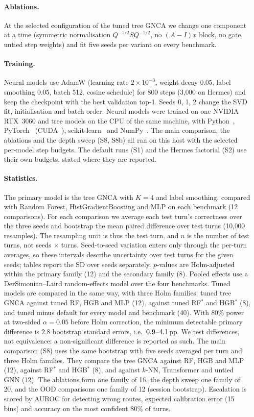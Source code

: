 \documentclass[10pt]{article}
\begin{document}
\paragraph{Ablations.} At the selected configuration of the tuned tree GNCA we change one component at a time (symmetric normalisation $Q^{-1/2}SQ^{-1/2}$, no $(A{-}I)x$ block, no gate, untied step weights) and fit five seeds per variant on every benchmark.
\paragraph{Training.} Neural models use AdamW (learning rate $2\times10^{-3}$, weight decay 0.05, label smoothing 0.05, batch 512, cosine schedule) for 800 steps (3{,}000 on Hermes) and keep the checkpoint with the best validation top-1. Seeds 0, 1, 2 change the SVD fit, initialisation and batch order. Neural models were trained on one NVIDIA RTX~3060 and tree models on the CPU of the same machine, with Python~\numEnvPython, PyTorch~\numEnvTorch{} (CUDA~\numEnvCuda), scikit-learn~\numEnvSklearn{} and NumPy~\numEnvNumpy. The main comparison, the ablations and the depth sweep (S8, S8b) all ran on this host with the selected per-model step budgets. The default runs (S1) and the Hermes factorial (S2) use their own budgets, stated where they are reported.
\paragraph{Statistics.} The primary model is the tree GNCA with $K{=}4$ and label smoothing, compared with Random Forest, HistGradientBoosting and MLP on each benchmark (12 comparisons). For each comparison we average each test turn's correctness over the three seeds and bootstrap the mean paired difference over test turns (10{,}000 resamples). The resampling unit is thus the test turn, and $n$ is the number of test turns, not seeds $\times$ turns. Seed-to-seed variation enters only through the per-turn averages, so these intervals describe uncertainty over test turns for the given seeds; tables report the SD over seeds separately. $p$-values are Holm-adjusted within the primary family (12) and the secondary family (8). Pooled effects use a DerSimonian--Laird random-effects model over the four benchmarks. Tuned models are compared in the same way, with three Holm families: tuned tree GNCA against tuned RF, HGB and MLP (12), against tuned RF$^\ast$ and HGB$^\ast$ (8), and tuned minus default for every model and benchmark (40). With 80\% power at two-sided $\alpha{=}0.05$ before Holm correction, the minimum detectable primary difference is $2.8$ bootstrap standard errors, i.e.\ $0.9$--$4.1$\,pp. We test differences, not equivalence: a non-significant difference is reported as such. The main comparison (S8) uses the same bootstrap with five seeds averaged per turn and three Holm families. They compare the tree GNCA against RF, HGB and MLP (12), against RF$^\ast$ and HGB$^\ast$ (8), and against $k$-NN, Transformer and untied GNN (12). The ablations form one family of 16, the depth sweep one family of 20, and the OOD comparisons one family of 12 (session bootstrap). Escalation is scored by AUROC for detecting wrong routes, expected calibration error (15 bins) and accuracy on the most confident 80\% of turns.
\end{document}
